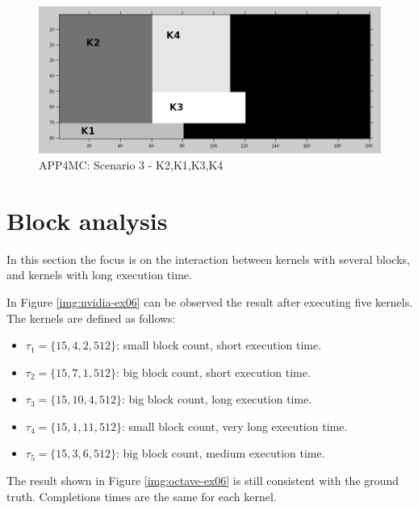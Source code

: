 \documentclass[
  12pt,
  a4paperpaper,
]{report}
\providecommand{\tightlist}{%
  \setlength{\itemsep}{0pt}\setlength{\parskip}{0pt}}
\begin{document}
\begin{figure}
\centering
\includegraphics[width=1\textwidth,height=\textheight]{source/figures/octave/ex05.png}
\caption{APP4MC: Scenario 3 - K2,K1,K3,K4 \label{img:octave-ex05}}
\end{figure}

\hypertarget{block-analysis}{%
\section{Block analysis}\label{more-results}}

In this section the focus is on the interaction between kernels with several blocks, and kernels with long execution time.

In Figure \ref{img:nvidia-ex06} can be observed the result after
executing five kernels. The kernels are defined as follows:

\begin{itemize}
\tightlist
\item
  \(\tau_1 = \{15,4,2,512\}\): small block count, short execution time.
\item
  \(\tau_2 = \{15, 7,1,512\}\): big block count, short execution time.
\item
  \(\tau_3 = \{15,10,4,512\}\): big block count, long execution time.
\item
  \(\tau_4 =\{ 15, 1,11,512\}\): small block count, very long execution
  time.
\item
  \(\tau_5 = \{15,3,6,512\}\): big block count, medium execution time.
\end{itemize}

The result shown in Figure \ref{img:octave-ex06} is still consistent
with the ground truth. Completions times are the same for each kernel.
\end{document}
